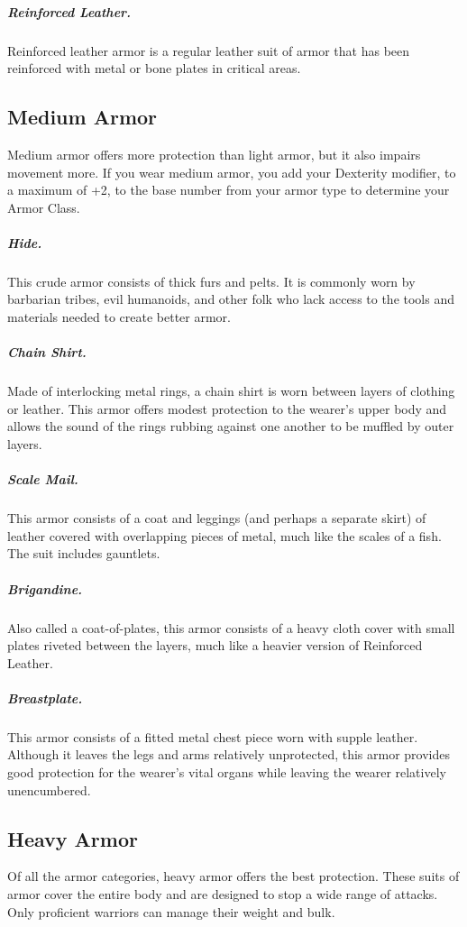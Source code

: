 \subparagraph*{Reinforced Leather.} Reinforced leather armor is a regular leather suit of armor that has been reinforced with metal or bone plates in critical areas.

\subsection{Medium Armor}

Medium armor offers more protection than light armor, but it also impairs movement more. If you wear medium armor, you add your Dexterity modifier, to a maximum of +2, to the base number from your armor type to determine your Armor Class.

\subparagraph*{Hide.} This crude armor consists of thick furs and pelts. It is commonly worn by barbarian tribes, evil humanoids, and other folk who lack access to the tools and materials needed to create better armor.

\subparagraph*{Chain Shirt.} Made of interlocking metal rings, a chain shirt is worn between layers of clothing or leather. This armor offers modest protection to the wearer's upper body and allows the sound of the rings rubbing against one another to be muffled by outer layers.

\subparagraph*{Scale Mail.} This armor consists of a coat and leggings (and perhaps a separate skirt) of leather covered with overlapping pieces of metal, much like the scales of a fish. The suit includes gauntlets.

\subparagraph*{Brigandine.} Also called a coat-of-plates, this armor consists of a heavy cloth cover with small plates riveted between the layers, much like a heavier version of Reinforced Leather.

\subparagraph*{Breastplate.} This armor consists of a fitted metal chest piece worn with supple leather. Although it leaves the legs and arms relatively unprotected, this armor provides good protection for the wearer's vital organs while leaving the wearer relatively unencumbered.

\subsection{Heavy Armor}

Of all the armor categories, heavy armor offers the best protection. These suits of armor cover the entire body and are designed to stop a wide range of attacks. Only proficient warriors can manage their weight and bulk.

